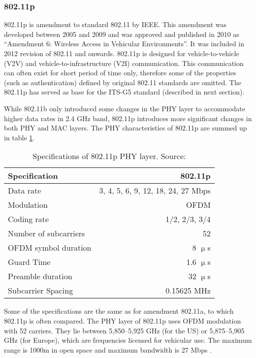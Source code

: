 \subsubsection{802.11p} \label{sec:802.11p}
% 
802.11p is amendment to standard 802.11 by IEEE. This amendment was developed between 2005 and 2009 and was approved and published in 2010 as \enquote{Amendment 6: Wireless Access in Vehicular Environments}. It was included in 2012 revision of 802.11 and onwards.
802.11p is designed for vehicle-to-vehicle (V2V) and vehicle-to-infrastructure (V2I) communication. This communication can often exist for short period of time only, therefore some of the properties (such as authentication) defined by original 802.11 standards are omitted. The 802.11p has served as base for the ITS-G5 standard (described in next section).\par
% 
% 
While 802.11b only introduced some changes in the PHY layer to accommodate higher data rates in 2.4 GHz band, 802.11p introduces more significant changes in both PHY and MAC layers.
The PHY characteristics of 802.11p are summed up in table \ref{table:11pPHY}.
% 
\begin{table}[h]
\centering
\begin{tabular}{|l|r|}
    \hline
    \rowcolor{lightgray} Specification & 802.11p \\
    \hline
    Data rate & 3, 4, 5, 6, 9, 12, 18, 24, 27 Mbps \\
    \hline
    Modulation & OFDM \\
    \hline
    Coding rate & 1/2, 2/3, 3/4 \\
    \hline
    Number of subcarriers & 52 \\
    \hline
    OFDM symbol duration & 8 $\upmu$s \\
    \hline
    Guard Time & 1.6 $\upmu$s \\
    \hline
    Preamble duration & 32 $\upmu$s \\
    \hline
    Subcarrier Spacing & 0.15625 MHz \\
    \hline
\end{tabular}
\caption{Specifications of 802.11p PHY layer. Source: \cite{Abdelgader2014TheChallenges}}
\label{table:11pPHY}
\end{table}
% 
Some of the specifications are the same as for amendment 802.11a, to which 802.11p is often compared. The PHY layer of 802.11p uses OFDM modulation with 52 carriers.
They lie between 5,850–5,925 GHz (for the US) or 5,875–5,905 GHz (for Europe), which are frequencies licensed for vehicular use. The maximum range is 1000m in open space and maximum bandwidth is 27 Mbps \cite{Abdelgader2014TheChallenges}.
